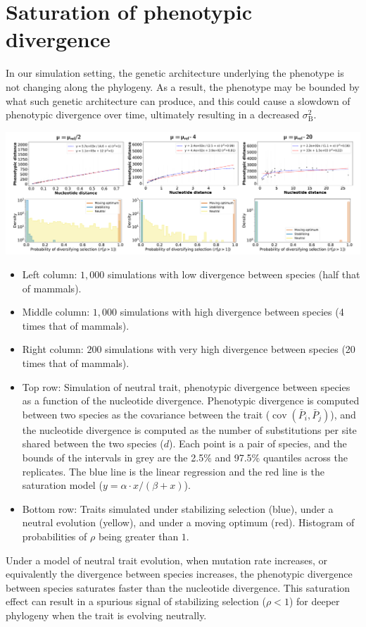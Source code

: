 \documentclass{article}
\newcommand{\Multiply}{\cdot}
\DeclareMathOperator{\Cov}{\text{cov}}
\newcommand{\Spi}{i}
\newcommand{\Spj}{j}
\newcommand{\Trait}{P}
\newcommand{\MeanTrait}{\bar{\Trait}}
\newcommand{\VarPhy}{\Cov \left( \MeanTrait_{\Spi}, \MeanTrait_{\Spj}\right)}
\newcommand{\RateBetween}{\sigma^2_{\mathrm{B}}}
\newcommand{\NI}{\rho}
\begin{document}
\newpage
\section{Saturation of phenotypic divergence}\label{sec:supp-distance}

In our simulation setting, the genetic architecture underlying the phenotype is not changing along the phylogeny.
As a result, the phenotype may be bounded by what such genetic architecture can produce, and this could cause a slowdown of phenotypic divergence over time, ultimately resulting in a decreased $\RateBetween$.

\begin{center}
    \includegraphics[width=1.0\textwidth, page=1] {figureS2}
    \label{fig:supp-distance}
\end{center}
\begin{itemize}
    \item Left column: $1,000$ simulations with low divergence between species (half that of mammals).
    \item Middle column: $1,000$ simulations with high divergence between species (4 times that of mammals).
    \item Right column: $200$ simulations with very high divergence between species (20 times that of mammals).
    \item Top row: Simulation of neutral trait, phenotypic divergence between species as a function of the nucleotide divergence. Phenotypic divergence is computed between two species as the covariance between the trait ($\VarPhy$), and the nucleotide divergence is computed as the number of substitutions per site shared between the two species ($d$). Each point is a pair of species, and the bounds of the intervals in grey are the 2.5\% and 97.5\% quantiles across the replicates. The blue line is the linear regression and the red line is the saturation model ($y = \alpha \Multiply x / (\beta + x)$).
    \item Bottom row: Traits simulated under stabilizing selection (blue), under a neutral evolution (yellow), and under a moving optimum (red). Histogram of probabilities of $\NI$ being greater than $1$.
\end{itemize}
Under a model of neutral trait evolution, when mutation rate increases, or equivalently the divergence between species increases, the phenotypic divergence between species saturates faster than the nucleotide divergence.
This saturation effect can result in a spurious signal of stabilizing selection ($\NI < 1$) for deeper phylogeny when the trait is evolving neutrally.
\end{document}
